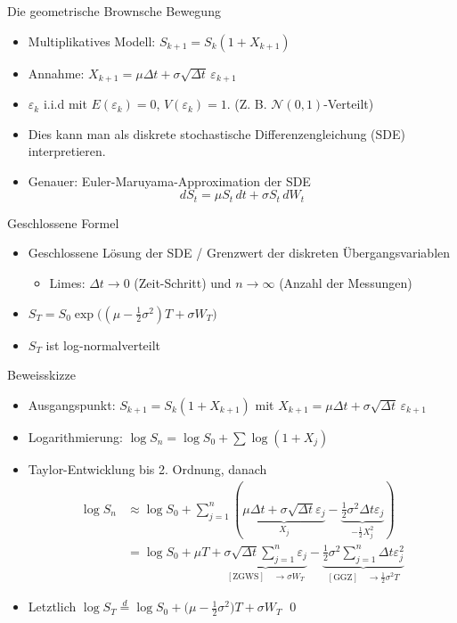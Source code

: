 \documentclass{beamer}
\begin{document}
\begin{frame}{Die geometrische Brownsche Bewegung}
  \begin{itemize}
      \item Multiplikatives Modell: $S_{k+1}=S_k(1+X_{k+1})$
      \item Annahme: $X_{k+1}=\mu\Delta t+\sigma\sqrt{\Delta t}\,\varepsilon_{k+1}$
      \item $\varepsilon_k$ i.i.d mit $E(\varepsilon_k)=0$, $V(\varepsilon_k)=1$. (Z. B. $\mathcal N(0,1)$-Verteilt)
      \item Dies kann man als diskrete stochastische Differenzengleichung (SDE) interpretieren.
      \item Genauer: Euler-Maruyama-Approximation der SDE $$dS_t = \mu S_t\,dt + \sigma S_t\,dW_t$$
  \end{itemize}
\end{frame}

\begin{frame}{Geschlossene Formel}
  \begin{itemize}
      \item Geschlossene Lösung der SDE / Grenzwert der diskreten Übergangsvariablen
      \begin{itemize}
        \item Limes: $\Delta t \to 0$ (Zeit-Schritt) und $n \to \infty$ (Anzahl der Messungen)
      \end{itemize}
      \item $S_T = S_0 \exp\big((\mu-\tfrac12\sigma^2)T + \sigma W_T\big)$
      \item $S_T$ ist log-normalverteilt
  \end{itemize}
\end{frame}

\begin{frame}{Beweisskizze}
  \begin{itemize}
      \item Ausgangspunkt: $S_{k+1}=S_k(1+X_{k+1})$ mit $X_{k+1}=\mu\Delta t+\sigma\sqrt{\Delta t}\,\varepsilon_{k+1}$
      \item Logarithmierung: $\log S_n = \log S_0 + \sum \log(1+X_j)$
      \item Taylor-Entwicklung bis 2. Ordnung, danach $$
\begin{aligned}
\log S_n &\approx \log S_0 + \sum_{j=1}^n\left( \underbrace{\mu \Delta t + \sigma\sqrt{\Delta t} \varepsilon_j}_{X_j} - \underbrace{\frac{1}{2} \sigma^2 \Delta t \varepsilon_j}_{-\frac{1}{2} X_j^2} \right)
\\ &= \log S_0 + \mu T +  \underbrace{\sigma\sqrt{\Delta t} \sum_{j=1}^{n} \varepsilon_j}_{\mathrm{[ZGWS]} \quad \to \sigma W_T} - \underbrace{\frac{1}{2} \sigma^2 \sum_{j=1}^{n} \Delta t \varepsilon_j^2}_{\mathrm{[GGZ]} \quad \to \frac12 \sigma^2 T}
\end{aligned}
$$
      \item Letztlich $\log S_T \overset{d} = \log S_0 + \big(\mu - \tfrac12 \sigma^2\big)T + \sigma W_T$ \qed
  \end{itemize}
\end{frame}
\end{document}
